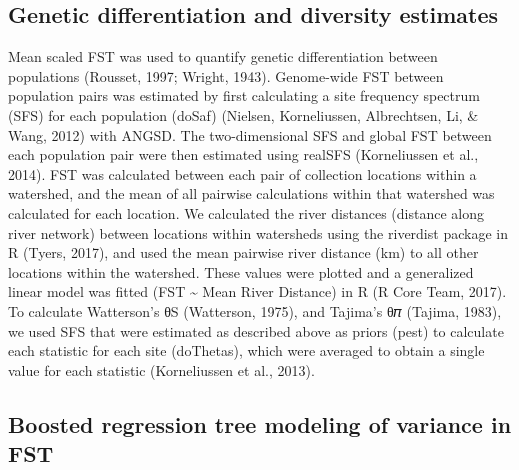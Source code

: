 \documentclass[twoside,12pt,final]{ucthesis-CA2012} %
\begin{document}
\begin{ucmainmatter}
\hypertarget{genetic-differentiation-and-diversity-estimates}{%
\subsection{Genetic differentiation and diversity
estimates}\label{genetic-differentiation-and-diversity-estimates}}

Mean scaled FST was used to quantify genetic differentiation between
populations (Rousset, 1997; Wright, 1943). Genome-wide FST between
population pairs was estimated by first calculating a site frequency
spectrum (SFS) for each population (doSaf) (Nielsen, Korneliussen,
Albrechtsen, Li, \& Wang, 2012) with ANGSD. The two-dimensional SFS and
global FST between each population pair were then estimated using
realSFS (Korneliussen et al., 2014). FST was calculated between each
pair of collection locations within a watershed, and the mean of all
pairwise calculations within that watershed was calculated for each
location. We calculated the river distances (distance along river
network) between locations within watersheds using the riverdist package
in R (Tyers, 2017), and used the mean pairwise river distance (km) to
all other locations within the watershed. These values were plotted and
a generalized linear model was fitted (FST \textasciitilde{} Mean River
Distance) in R (R Core Team, 2017). To calculate Watterson's θS
(Watterson, 1975), and Tajima's θ𝜋 (Tajima, 1983), we used SFS that were
estimated as described above as priors (pest) to calculate each
statistic for each site (doThetas), which were averaged to obtain a
single value for each statistic (Korneliussen et al., 2013).

\hypertarget{boosted-regression-tree-modeling-of-variance-in-fst}{%
\subsection{Boosted regression tree modeling of variance in
FST}\label{boosted-regression-tree-modeling-of-variance-in-fst}}


\end{ucmainmatter}
\end{document}

